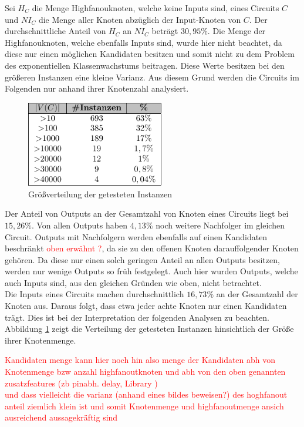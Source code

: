 \documentclass[11pt, a4paper, german]{article}
\begin{document}
Sei $H_C$ die Menge Highfanouknoten, welche keine Inputs sind, eines Circuits $C$ und $NI_C$ die Menge aller Knoten abz\"uglich der Input-Knoten von $C$. Der durchschnittliche Anteil von $H_C$ an $NI_C$ betr\"agt $30,95\%$. Die Menge der Highfanouknoten, welche ebenfalls Inputs sind, wurde hier nicht beachtet, da diese nur einen m\"oglichen Kandidaten besitzen und somit nicht zu dem Problem des exponentiellen Klassenwachstums beitragen. Diese Werte besitzen bei den gr\"o{\ss}eren Instanzen eine kleine Varianz. Aus diesem Grund werden die Circuits im Folgenden nur anhand ihrer Knotenzahl analysiert.\\
   \begin{figure}
		\includegraphics[width = 6cm]{pictures/compiled/instance_sizes_distribution_table}
		\caption{Gr\"o\ss verteilung der getesteten Instanzen}
		\label{bild:sizes_table}
	\end{figure}
 Der Anteil von Outputs an der Gesamtzahl von Knoten eines Circuits liegt bei $15,26\%$. Von allen Outputs haben $4,13\%$ noch weitere Nachfolger im gleichen Circuit. Outputs mit Nachfolgern werden ebenfalls auf einen Kandidaten beschr\"ankt \textcolor{red}{oben erw\"ahnt ?}, da sie zu den offenen Knoten darauffolgender Knoten gehören. Da diese nur einen solch geringen Anteil an allen Outputs besitzen, werden nur wenige Outputs so fr\"uh festgelegt. Auch hier wurden Outputs, welche auch Inputs sind, aus den gleichen Gr\"unden wie oben, nicht betrachtet.\\
 Die Inputs eines Circuits machen durchschnittlich $16,73\%$ an der Gesamtzahl der Knoten aus. Daraus folgt, dass etwa jeder achte Knoten nur einen Kandidaten tr\"agt. Dies ist bei der Interpretation der folgenden Analysen zu beachten.\\
 Abbildung \ref{bild:sizes_table} zeigt die Verteilung der getesteten Instanzen hinsichtlich der Größe  ihrer Knotenmenge.
 
\textcolor{red}{ Kandidaten menge kann hier noch hin also menge der Kandidaten abh von Knotenmenge bzw anzahl highfanoutknoten  und abh von den oben genannten zusatzfeatures (zb pinabh. delay, Library )  \\  und dass vielleicht die varianz (anhand eines bildes beweisen?) des hoghfanout anteil ziemlich klein ist und somit Knotenmenge und highfanoutmenge ansich ausreichend aussagekräftig sind} 
 
\end{document}

